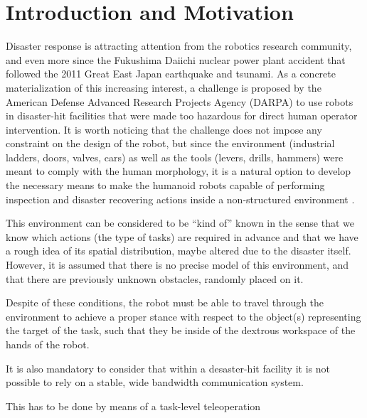 \section{Introduction and Motivation}
	\label{sec:introduction}

	Disaster response is attracting attention from the robotics research community, and even more since the
	Fukushima Daiichi nuclear power plant accident that followed the 2011 Great East Japan earthquake and tsunami.
	As a concrete materialization of this increasing interest, a challenge is proposed by the American Defense
	Advanced Research Projects Agency (DARPA) to use robots in disaster-hit facilities that were made too hazardous
	for direct human operator intervention.
	It is worth noticing that the challenge does not impose any constraint on the design of the robot, but since the
	environment (industrial ladders, doors, valves, cars) as well as the tools (levers, drills, hammers) were meant
	to comply with the human morphology, it is a natural option to develop the necessary means to make the humanoid
	robots capable of performing inspection and disaster recovering actions inside a non-structured environment
	\cite{Bouyarmane}.
	
	This environment can be considered to be ``kind of'' known in the sense that we know which actions
	(the type of tasks)	are required in advance and that we have a rough idea of its spatial distribution,
	maybe altered due to the disaster itself.
	However, it is assumed that there is no precise model of this environment, and that there are previously unknown
	obstacles, randomly placed on it.
	
	Despite of these conditions, the robot must be able to travel through the environment to achieve a proper stance
	with respect to the object(s) representing the target of the task, such that they be inside of the dextrous
	workspace of the hands of the robot.
	
	It is also mandatory to consider that within a desaster-hit facility it is not possible to rely on a stable,
	wide bandwidth communication system.
	
	This has to be done by means of a task-level teleoperation
